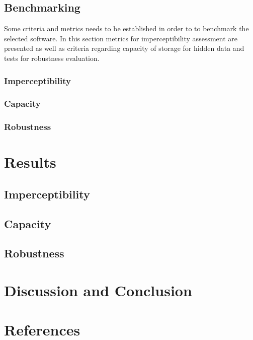 \documentclass[11pt]{article}
\begin{document}
\subsection{Benchmarking}

Some criteria and metrics needs to be established in order to to benchmark the selected software.
In this section metrics for imperceptibility assessment are presented as well as criteria regarding capacity of storage for
hidden data and tests for robustness evaluation.

\subsubsection{Imperceptibility}

\subsubsection{Capacity}

\subsubsection{Robustness}


\section{Results}


\subsection{Imperceptibility}

\subsection{Capacity}

\subsection{Robustness}


\section{Discussion and Conclusion}


\section{References}
\end{document}
